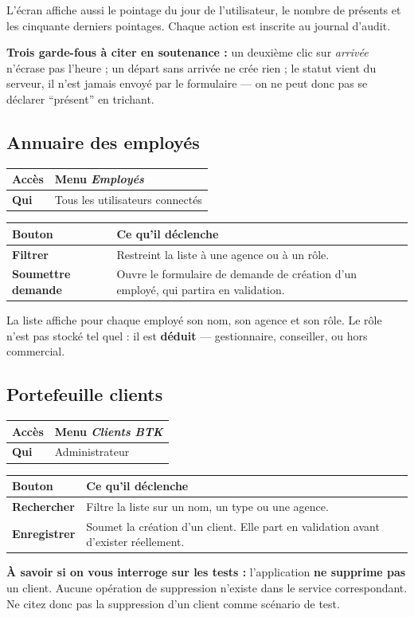 \documentclass[a4paper,11pt]{article}
\newcommand{\ecran}[3]{%
  \subsection{#1}%
  \noindent\begin{tabularx}{\textwidth}{|>{\columncolor{btkpale}\bfseries}L{2.3cm}|X|}
  \hline
  \textbf{Accès} & #2\\
  \hline
  \textbf{Qui} & #3\\
  \hline
  \end{tabularx}\par\vspace{0.4em}}
\begin{document}
\vspace{0.4em}
L'écran affiche aussi le pointage du jour de l'utilisateur, le nombre de
présents et les cinquante derniers pointages. Chaque action est inscrite au
journal d'audit.

\begin{note}
\textbf{Trois garde-fous à citer en soutenance :} un deuxième clic sur
\emph{arrivée} n'écrase pas l'heure ; un départ sans arrivée ne crée rien ; le
statut vient du serveur, il n'est jamais envoyé par le formulaire --- on ne peut
donc pas se déclarer \enquote{présent} en trichant.
\end{note}

\ecran{Annuaire des employés}{Menu \emph{Employés}}{Tous les utilisateurs connectés}

\noindent\begin{tabularx}{\textwidth}{|>{\bfseries}L{4.4cm}|X|}
\hline
\textmd{\textbf{Bouton}} & \textbf{Ce qu'il déclenche}\\
\hline
Filtrer & Restreint la liste à une agence ou à un rôle.\\
\hline
Soumettre demande & Ouvre le formulaire de demande de création d'un employé, qui partira en validation.\\
\hline
\end{tabularx}

\vspace{0.4em}
La liste affiche pour chaque employé son nom, son agence et son rôle. Le rôle
n'est pas stocké tel quel : il est \textbf{déduit} --- gestionnaire, conseiller,
ou hors commercial.

\ecran{Portefeuille clients}{Menu \emph{Clients BTK}}{Administrateur}

\noindent\begin{tabularx}{\textwidth}{|>{\bfseries}L{4.4cm}|X|}
\hline
\textmd{\textbf{Bouton}} & \textbf{Ce qu'il déclenche}\\
\hline
Rechercher & Filtre la liste sur un nom, un type ou une agence.\\
\hline
Enregistrer & Soumet la création d'un client. Elle part en validation avant d'exister réellement.\\
\hline
\end{tabularx}

\begin{alerte}
\textbf{À savoir si on vous interroge sur les tests :} l'application \textbf{ne
supprime pas} un client. Aucune opération de suppression n'existe dans le
service correspondant. Ne citez donc pas la suppression d'un client comme
scénario de test.
\end{alerte}
\end{document}

